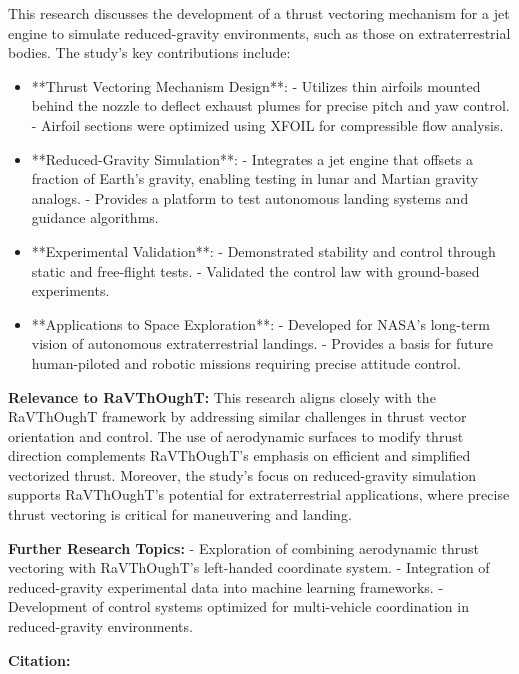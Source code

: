 This research discusses the development of a thrust vectoring mechanism for a jet engine to simulate reduced-gravity environments, such as those on extraterrestrial bodies. The study's key contributions include:

\begin{itemize}
  \item **Thrust Vectoring Mechanism Design**:
  - Utilizes thin airfoils mounted behind the nozzle to deflect exhaust plumes for precise pitch and yaw control.
  - Airfoil sections were optimized using XFOIL for compressible flow analysis.

  \item **Reduced-Gravity Simulation**:
  - Integrates a jet engine that offsets a fraction of Earth's gravity, enabling testing in lunar and Martian gravity analogs.
  - Provides a platform to test autonomous landing systems and guidance algorithms.

  \item **Experimental Validation**:
  - Demonstrated stability and control through static and free-flight tests.
  - Validated the control law with ground-based experiments.

  \item **Applications to Space Exploration**:
  - Developed for NASA's long-term vision of autonomous extraterrestrial landings.
  - Provides a basis for future human-piloted and robotic missions requiring precise attitude control.
\end{itemize}

\textbf{Relevance to RaVThOughT:}
This research aligns closely with the RaVThOughT framework by addressing similar challenges in thrust vector orientation and control. The use of aerodynamic surfaces to modify thrust direction complements RaVThOughT's emphasis on efficient and simplified vectorized thrust. Moreover, the study's focus on reduced-gravity simulation supports RaVThOughT's potential for extraterrestrial applications, where precise thrust vectoring is critical for maneuvering and landing.

\textbf{Further Research Topics:}
- Exploration of combining aerodynamic thrust vectoring with RaVThOughT’s left-handed coordinate system.
- Integration of reduced-gravity experimental data into machine learning frameworks.
- Development of control systems optimized for multi-vehicle coordination in reduced-gravity environments.

\textbf{Citation:} 



\endinput  %
